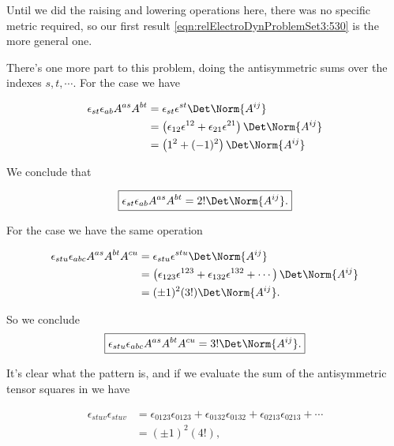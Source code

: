 Until we did the raising and lowering operations here, there was no specific metric required, so our first result \ref{eqn:relElectroDynProblemSet3:530} is the more general one.

There's one more part to this problem, doing the antisymmetric sums over the indexes $s, t, \cdots$.  For the  case we have

\begin{align*}
\epsilon_{s t} \epsilon_{a b} A^{a s} A^{b t}
&=
\epsilon_{s t} \epsilon^{s t} \Det \Norm{A^{ij}} \\
&=
\left( 
\epsilon_{1 2} \epsilon^{1 2} 
+\epsilon_{2 1} \epsilon^{2 1} 
\right)
\Det \Norm{A^{ij}} \\
&=
\left( 
1^2 + (-1)^2
\right)
\Det \Norm{A^{ij}}
\end{align*}

We conclude that

\begin{equation}\label{eqn:relElectroDynProblemSet3:n}
\boxed{
\epsilon_{s t} \epsilon_{a b} A^{a s} A^{b t} = 2! \Det \Norm{A^{ij}}.
}
\end{equation}

For the  case we have the same operation

\begin{align*}
\epsilon_{s t u} \epsilon_{a b c} A^{a s} A^{b t} A^{c u}
&=
\epsilon_{s t u} \epsilon^{s t u} \Det \Norm{A^{ij}} \\
&=
\left( 
\epsilon_{1 2 3} \epsilon^{1 2 3} 
+\epsilon_{1 3 2} \epsilon^{1 3 2} 
+ \cdots
\right)
\Det \Norm{A^{ij}} \\
&=
(\pm 1)^2 (3!)
\Det \Norm{A^{ij}}.
\end{align*}

So we conclude
\begin{equation}\label{eqn:relElectroDynProblemSet3:n}
\boxed{
\epsilon_{s t u} \epsilon_{a b c} A^{a s} A^{b t} A^{c u}= 3! \Det \Norm{A^{ij}}.
}
\end{equation}

It's clear what the pattern is, and if we evaluate the sum of the antisymmetric tensor squares in  we have

\begin{align*}
\epsilon_{s t u v} \epsilon_{s t u v}
&=
\epsilon_{0 1 2 3} \epsilon_{0 1 2 3}
+
\epsilon_{0 1 3 2} \epsilon_{0 1 3 2}
+
\epsilon_{0 2 1 3} \epsilon_{0 2 1 3}
+ \cdots \\
&= (\pm 1)^2 (4!),
\end{align*}


